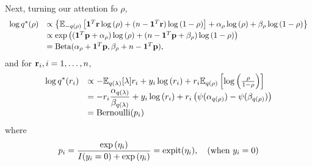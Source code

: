 \documentclass{amsart}[12pt]
\begin{document}
\noindent Next, turning our attention fo $\rho$,
\[
\begin{array}{rl}
	\log{q^*(\rho)} 
	  &                                                                 
	\propto \left\{ 
	{\mathbb E}_{-q(\rho)}\left[ 
	{\bf 1}^T{\bf r} \log{(\rho)} 
	+ (n - {\bf 1}^T{\bf r}) \log{(1 - \rho)} 
	\right] 
	+ \alpha_\rho \log{(\rho)} 
	+ \beta_\rho \log{(1 - \rho)} 
	\right\} 
	\\ [0.5ex]
	  &                                                                 
	\propto \exp \left( 
	({\bf 1}^T{\bf p} + \alpha_\rho) \log{(\rho)} 
	+ (n - {\bf 1}^T{\bf p} + \beta_\rho) \log{(1 - \rho)} 
	\right) 
	\\ [0.5ex]
	  & = \text{Beta}(\alpha_\rho + {\bf 1}^T{\bf p}, \beta_\rho + n - {\bf 1}^T{\bf p}), 
\end{array}
\]
\noindent and for ${\bf r}_i, i=1, \ldots, n$,
\[
\begin{array}{rl}
	\ds \log{q^*(r_i)} & \propto -\bE_{q(\lambda)} [\lambda ] r_i + y_i \log{(r_i)} + r_i \bE_{q(\rho)} \left[\log{\left(\frac{\rho}{1 - \rho}\right)}\right]          \\[0.5ex]
	                   & \ds = -r_i \frac{\alpha_{q(\lambda)}}{\beta_{q(\lambda)}} + y_i \log{(r_i)} + r_i \left(\psi(\alpha_{q(\rho)}) - \psi(\beta_{q(\rho)})\right) \\ [0.5ex]%
	                   & \ds = \text{Bernoulli}(p_i)                                                                                                                   
\end{array}
\]
\noindent where
\[
\begin{array}{rl}
	\displaystyle p_i                                               
	= \frac{\exp{(\eta_i)}}{I(y_i = 0) + \exp{(\eta_i)}}  
	= \text{expit}(\eta_i), \quad \mbox{(when $y_i = 0$)} 
\end{array}
\]
\end{document}
